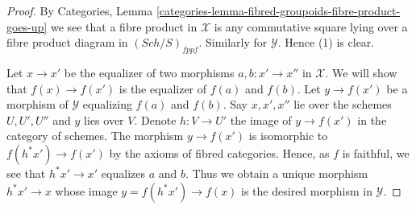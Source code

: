 \documentclass[10pt,a4paper]{amsart}
\theoremstyle{plain}
\theoremstyle{definition}
\theoremstyle{remark}
\numberwithin{equation}{subsection}
\def\Sch{\mathit{Sch}}
\begin{document}
\begin{proof}
By
Categories, Lemma \ref{categories-lemma-fibred-groupoids-fibre-product-goes-up}
we see that a fibre product in $\mathcal{X}$ is any commutative square lying
over a fibre product diagram in $(\Sch/S)_{fppf}$. Similarly for
$\mathcal{Y}$. Hence (1) is clear.

\medskip\noindent
Let $x \to x'$ be the equalizer of two morphisms $a, b : x' \to x''$
in $\mathcal{X}$. We will show that $f(x) \to f(x')$ is the equalizer
of $f(a)$ and $f(b)$. Let $y \to f(x')$ be a morphism of $\mathcal{Y}$
equalizing $f(a)$ and $f(b)$. Say $x, x', x''$ lie over the schemes
$U, U', U''$ and $y$ lies over $V$. Denote $h : V \to U'$ the image
of $y \to f(x')$ in the category of schemes. The morphism
$y \to f(x')$ is isomorphic to $f(h^*x') \to f(x')$ by the axioms of
fibred categories. Hence, as $f$ is faithful, we see that
$h^*x' \to x'$ equalizes $a$ and $b$. Thus we obtain a unique morphism
$h^*x' \to x$ whose image $y = f(h^*x') \to f(x)$ is the desired morphism
in $\mathcal{Y}$.
\end{proof}
\end{document}
